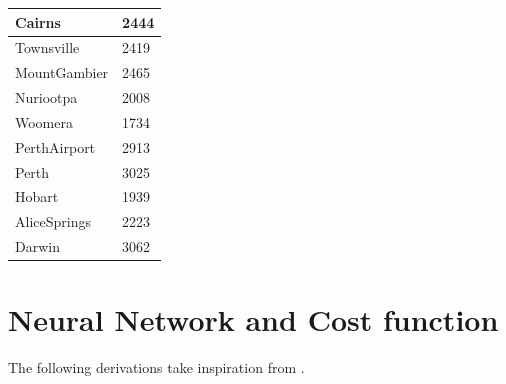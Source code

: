 \documentclass[11pt]{article}
\begin{document}
\begin{table}[H]
\begin{small}
\begin{center}
\begin{tabular}{|l|l|}
                \hline
                Cairns                   & 2444                  \\
                \hline
                Townsville               & 2419                  \\
                \hline
                MountGambier             & 2465                  \\
                \hline
                Nuriootpa                & 2008                  \\
                \hline
                Woomera                  & 1734                  \\
                \hline
                PerthAirport             & 2913                  \\
                \hline
                Perth                    & 3025                  \\
                \hline
                Hobart                   & 1939                  \\
                \hline
                AliceSprings             & 2223                  \\
                \hline
                Darwin                   & 3062                  \\
                \hline
            \end{tabular}
        \end{center}
    \end{small}
\end{table}

\section{Neural Network and Cost function}
\label{app:NN}
The following derivations take inspiration from \cite{project2}.
\end{document}
